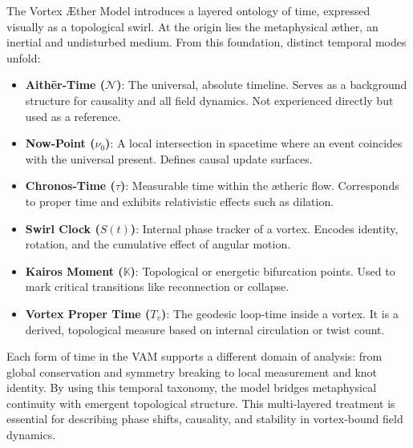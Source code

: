 \documentclass[a4paper,12pt]{article}
\begin{document}
    The Vortex Æther Model introduces a layered ontology of time, expressed visually as a topological swirl. At the origin lies the metaphysical æther, an inertial and undisturbed medium. From this foundation, distinct temporal modes unfold:

    \begin{itemize}
        \item \textbf{Aithēr-Time (\( \mathcal{N} \))}: The universal, absolute timeline. Serves as a background structure for causality and all field dynamics. Not experienced directly but used as a reference.
        \item \textbf{Now-Point (\( \nu_0 \))}: A local intersection in spacetime where an event coincides with the universal present. Defines causal update surfaces.
        \item \textbf{Chronos-Time (\( \tau \))}: Measurable time within the ætheric flow. Corresponds to proper time and exhibits relativistic effects such as dilation.
        \item \textbf{Swirl Clock (\( S(t) \))}: Internal phase tracker of a vortex. Encodes identity, rotation, and the cumulative effect of angular motion.
        \item \textbf{Kairos Moment (\( \mathbb{K} \))}: Topological or energetic bifurcation points. Used to mark critical transitions like reconnection or collapse.
        \item \textbf{Vortex Proper Time (\( T_v \))}: The geodesic loop-time inside a vortex. It is a derived, topological measure based on internal circulation or twist count.
    \end{itemize}

    Each form of time in the VAM supports a different domain of analysis: from global conservation and symmetry breaking to local measurement and knot identity. By using this temporal taxonomy, the model bridges metaphysical continuity with emergent topological structure. This multi-layered treatment is essential for describing phase shifts, causality, and stability in vortex-bound field dynamics.
\end{document}
